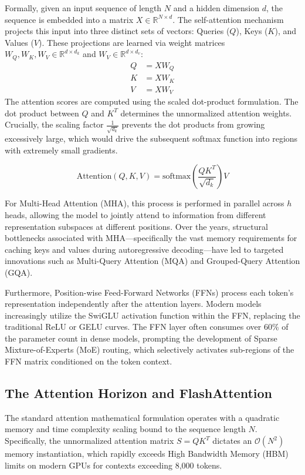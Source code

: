 \documentclass[12pt, a4paper]{report}
\begin{document}
Formally, given an input sequence of length $N$ and a hidden dimension $d$, the sequence is embedded into a matrix $X \in \mathbb{R}^{N \times d}$. The self-attention mechanism projects this input into three distinct sets of vectors: Queries ($Q$), Keys ($K$), and Values ($V$). These projections are learned via weight matrices $W_Q, W_K, W_V \in \mathbb{R}^{d \times d_k}$ and $W_V \in \mathbb{R}^{d \times d_v}$:
\begin{align}
    Q &= X W_Q \\
    K &= X W_K \\
    V &= X W_V
\end{align}
The attention scores are computed using the scaled dot-product formulation. The dot product between $Q$ and $K^T$ determines the unnormalized attention weights. Crucially, the scaling factor $\frac{1}{\sqrt{d_k}}$ prevents the dot products from growing excessively large, which would drive the subsequent softmax function into regions with extremely small gradients.

\begin{equation}
    \text{Attention}(Q, K, V) = \text{softmax}\left( \frac{Q K^T}{\sqrt{d_k}} \right) V
\end{equation}

For Multi-Head Attention (MHA), this process is performed in parallel across $h$ heads, allowing the model to jointly attend to information from different representation subspaces at different positions. Over the years, structural bottlenecks associated with MHA—specifically the vast memory requirements for caching keys and values during autoregressive decoding—have led to targeted innovations such as Multi-Query Attention (MQA) and Grouped-Query Attention (GQA). 

Furthermore, Position-wise Feed-Forward Networks (FFNs) process each token's representation independently after the attention layers. Modern models increasingly utilize the SwiGLU activation function within the FFN, replacing the traditional ReLU or GELU curves. The FFN layer often consumes over 60\% of the parameter count in dense models, prompting the development of Sparse Mixture-of-Experts (MoE) routing, which selectively activates sub-regions of the FFN matrix conditioned on the token context.

\subsection{The Attention Horizon and FlashAttention}
The standard attention mathematical formulation operates with a quadratic memory and time complexity scaling bound to the sequence length $N$. Specifically, the unnormalized attention matrix $S = QK^T$ dictates an $\mathcal{O}(N^2)$ memory instantiation, which rapidly exceeds High Bandwidth Memory (HBM) limits on modern GPUs for contexts exceeding 8,000 tokens. 
\end{document}
